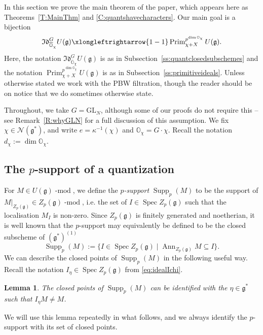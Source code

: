 \documentclass[twoside,12pt,reqno]{amsart}
\newtheorem{Lemma}[Theorem]{Lemma}
\theoremstyle{remark}
\numberwithin{equation}{section}
\def\lmod{\!\operatorname{-mod}}
\def\Ann{\operatorname{Ann}}
\def\Spec{\operatorname{Spec}}
\def\Prim{\operatorname{Prim}}
\def\Supp{\operatorname{Supp}}
\def\o{\overline}
\def\O{{\mathbb O}}
\def\GL{\mathrm{GL}}
\def\g{{\mathfrak g}}
\def\Idl{\mathfrak{Id}}
\newcommand{\Nc}{\mathcal{N}}
\begin{document}
In this section we prove the main theorem of the paper, which appears here as Theorems~\ref{T:MainThm} and \ref{C:quantshavecharacters}. Our main goal is a bijection $$\Idl_{\o{\O}_\chi}^{G} U(\g)\xlongleftrightarrow{1-1} \Prim_{\chi+X}^{p^{\dim\O_\chi}} U(\g).$$ Here, the notation $\Idl_{\o{\O}_\chi}^{G} U(\g)$ is as in Subsection~\ref{ss:quantclosedsubschemes} and the notation $\Prim_{\chi+X}^{p^{\dim\O_\chi}} U(\g)$ is as in Subsection~\ref{ss:primitiveideals}. Unless otherwise stated we work with the PBW filtration, though the reader should be on notice that we do sometimes otherwise state.

Throughout, we take $G=\GL_N$, although some of our proofs do not require this -- see Remark~\ref{R:whyGLN} for a full discussion of this assumption. We fix $\chi\in\Nc(\g^*)$, and write $e=\kappa^{-1}(\chi)$ and $\O_\chi=G\cdot\chi$. Recall the notation $d_\chi:=\dim\O_\chi$.

\subsection{The $p$-support of a quantization}\label{ss:psupport}

For $M \in U(\g)\lmod$, we define the {\em $p$-support} $\Supp_p(M)$ to be the support of $M|_{Z_p(\g)} \in Z_p(\g)\lmod$, i.e. the set of $I\in\Spec Z_p(\g)$ such that the localisation $M_I$ is non-zero. Since $Z_p(\g)$ is finitely generated and noetherian, it is well known that the $p$-support may equivalently be defined to be the closed subscheme of $(\g^*)^{(1)}$
 $$\Supp_p(M) := \{ I \in \Spec Z_p(\g) \mid \Ann_{Z_p(\g)}M\subseteq I\}.$$
We can describe the closed points of $\Supp_p(M)$ in the following useful way. Recall the notation $I_\eta \in \Spec Z_p(\g)$ from \eqref{eq:idealIchi}.
\begin{Lemma}
\label{L:whatissupport}
The closed points of $\Supp_p(M)$ can be identified with the $\eta \in \g^*$ such that $I_\eta M \ne M$.
\end{Lemma}
We will use this lemma repeatedly in what follows, and we always identify the $p$-support with its set of closed points.
\end{document}
